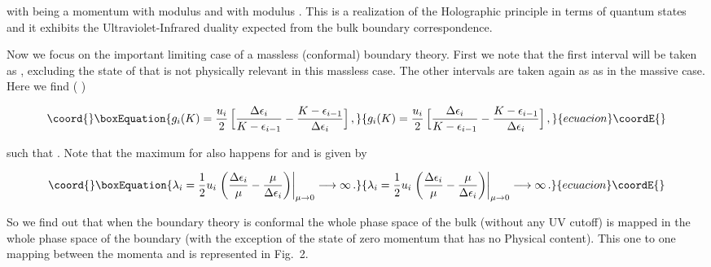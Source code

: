 \documentclass[a4paper,12pt]{article}
\begin{document}
{\noindent with \coordHE{} being a momentum with modulus
\coordHE{} and 
\coordHE{}  with modulus 
\coordHE{}.
This is a realization of the Holographic principle in terms of quantum states
and it exhibits the Ultraviolet-Infrared duality expected from  the bulk 
boundary correspondence\cite{HOL3}.

Now we focus  on the important limiting case of a massless (conformal) boundary theory.
First we note that the first interval will be taken as \coordHE{},
excluding the state of \coordHE{} that is not physically relevant in this massless case.
The other intervals are taken again as \coordHE{} 
as in the massive case. Here we find ( \coordHE{})

\begin{equation}\coord{}\boxEquation{
g_i (K) = {u_i \over 2} \,\Big[  { \Delta\epsilon_{i} \over K - \epsilon_{i-1}}
-  {K - \epsilon_{i-1}\over \Delta\epsilon_{i}}\Big]\,,
}{
g_i (K) = {u_i \over 2} \,\Big[  { \Delta\epsilon_{i} \over K - \epsilon_{i-1}}
-  {K - \epsilon_{i-1}\over \Delta\epsilon_{i}}\Big]\,,
}{ecuacion}\coordE{}\end{equation}

\noindent  such that \coordHE{}.
Note that the maximum  for \coordHE{} also happens for \coordHE{} 
and is given by

\begin{equation}\coord{}\boxEquation{
\lambda_i =  \frac 12 u_i
\left.\left(
{\Delta\epsilon_i\over \mu}-{\mu\over\Delta\epsilon_i}
\right)\right|_{\mu\to 0} \longrightarrow \infty\,.
}{
\lambda_i =  \frac 12 u_i
\left.\left(
{\Delta\epsilon_i\over \mu}-{\mu\over\Delta\epsilon_i}
\right)\right|_{\mu\to 0} \longrightarrow \infty\,.
}{ecuacion}\coordE{}\end{equation}
 
So we find out that when the boundary theory
is conformal the whole phase space of the bulk  (without any UV cutoff)
is mapped in the whole phase space of the boundary  (with the exception of the 
state of zero momentum that has no Physical content). 
This one to one mapping between the momenta \coordHE{} and \coordHE{} 
is represented in Fig.~2. 


}
\end{document}
